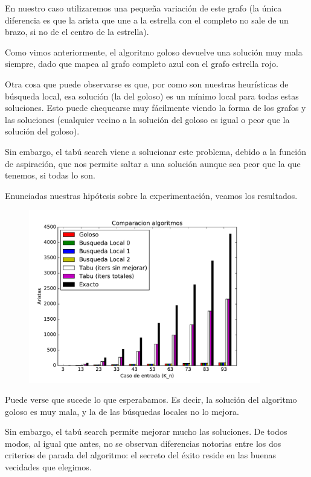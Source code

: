 En nuestro caso utilizaremos una pequeña variación de este grafo (la única diferencia es que la arista que une a la estrella con el completo no sale de un brazo, si no de el centro de la estrella).

Como vimos anteriormente, el algoritmo goloso devuelve una solución muy mala siempre, dado que mapea al grafo completo azul con el grafo estrella rojo. 

Otra cosa que puede observarse es que, por como son nuestras heurísticas de búsqueda local, esa solución (la del goloso) es un mínimo local para todas estas soluciones. Esto puede chequearse muy fácilmente viendo la forma de los grafos y las soluciones (cualquier vecino a la solución del goloso es igual o peor que la solución del goloso).

Sin embargo, el tabú search viene a solucionar este problema, debido a la función de aspiración, que nos permite saltar a una solución aunque sea peor que la que tenemos, si todas lo son.

Enunciadas nuestras hipótesis sobre la experimentación, veamos los resultados.

\begin{figure}[H]
 \centering
	\includegraphics[width=0.9\textwidth]{graficos/problema_7/exacto0.pdf}
	\caption{}
	\label{fig:problema7-exacto0}
\end{figure}


Puede verse que sucede lo que esperabamos. Es decir, la solución del algoritmo goloso es muy mala, y la de las búsquedas locales no lo mejora.

Sin embargo, el tabú search permite mejorar mucho las soluciones. De todos modos, al igual que antes, no se observan diferencias notorias entre los dos criterios de parada del algoritmo: el secreto del éxito reside en las buenas vecidades que elegimos.




